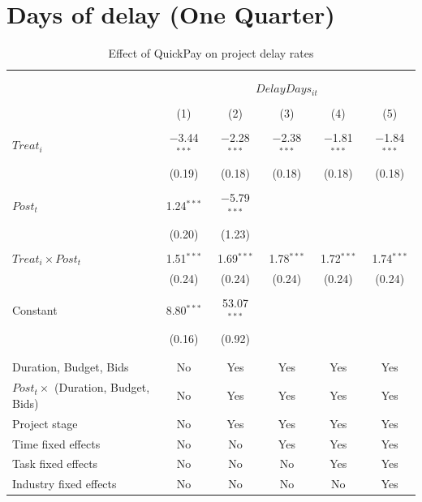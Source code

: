 \documentclass[
]{article}
\begin{document}
\hypertarget{days-of-delay-one-quarter}{%
\section{Days of delay (One Quarter)}\label{days-of-delay-one-quarter}}

\begin{table}[H] \centering 
  \caption{Effect of QuickPay on project delay rates} 
  \label{} 
\small 
\begin{tabular}{@{\extracolsep{-2pt}}lccccc} 
\\[-1.8ex]\hline 
\hline \\[-1.8ex] 
\\[-1.8ex] & \multicolumn{5}{c}{$DelayDays_{it}$} \\ 
\\[-1.8ex] & (1) & (2) & (3) & (4) & (5)\\ 
\hline \\[-1.8ex] 
 $Treat_i$ & $-$3.44$^{***}$ & $-$2.28$^{***}$ & $-$2.38$^{***}$ & $-$1.81$^{***}$ & $-$1.84$^{***}$ \\ 
  & (0.19) & (0.18) & (0.18) & (0.18) & (0.18) \\ 
  & & & & & \\ 
 $Post_t$ & 1.24$^{***}$ & $-$5.79$^{***}$ &  &  &  \\ 
  & (0.20) & (1.23) &  &  &  \\ 
  & & & & & \\ 
 $Treat_i \times Post_t$ & 1.51$^{***}$ & 1.69$^{***}$ & 1.78$^{***}$ & 1.72$^{***}$ & 1.74$^{***}$ \\ 
  & (0.24) & (0.24) & (0.24) & (0.24) & (0.24) \\ 
  & & & & & \\ 
 Constant & 8.80$^{***}$ & 53.07$^{***}$ &  &  &  \\ 
  & (0.16) & (0.92) &  &  &  \\ 
  & & & & & \\ 
\hline \\[-1.8ex] 
Duration, Budget, Bids & No & Yes & Yes & Yes & Yes \\ 
$Post_t \times$  (Duration, Budget, Bids) & No & Yes & Yes & Yes & Yes \\ 
Project stage & No & Yes & Yes & Yes & Yes \\ 
Time fixed effects & No & No & Yes & Yes & Yes \\ 
Task fixed effects & No & No & No & Yes & Yes \\ 
Industry fixed effects & No & No & No & No & Yes \\ 

\end{tabular}
\end{table}
\end{document}
